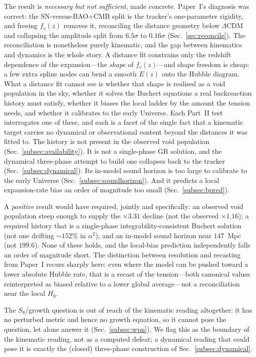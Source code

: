\documentclass[aps,prd,twocolumn,nofootinbib,superscriptaddress,floatfix]{revtex4-2}
\newcommand{\Ho}{H_{0}}
\newcommand{\fvz}{f_{v}(z)}
\newcommand{\Lcdm}{\Lambda\mathrm{CDM}}
\begin{document}
The result is \emph{necessary but not sufficient}, made concrete. Paper~I's
diagnosis was correct: the SN-versus-BAO$+$CMB split is the tracker's one-parameter
rigidity, and freeing $\fvz$ removes it, reconciling the distance geometry below
$\Lcdm$ and collapsing the amplitude split from $6.5\sigma$ to $0.16\sigma$
(Sec.~\ref{sec:reconcile}). The reconciliation is nonetheless purely kinematic, and
the gap between kinematics and dynamics is the whole story. A distance fit
constrains only the redshift dependence of the expansion---the \emph{shape} of
$\fvz$---and shape freedom is cheap: a few extra spline nodes can bend a smooth
$E(z)$ onto the Hubble diagram. What a distance fit cannot see is whether that
shape is realised as a void population in the sky, whether it solves the Buchert
equations a real backreaction history must satisfy, whether it biases the local
ladder by the amount the tension needs, and whether it calibrates to the early
Universe. Each Part~II test interrogates one of these, and each is a facet of the
single fact that a kinematic target carries no dynamical or observational content
beyond the distances it was fitted to. The history is not present in the observed
void population (Sec.~\ref{subsec:availability}). It is not a single-phase GR
solution, and the dynamical three-phase attempt to build one collapses back to the
tracker (Sec.~\ref{subsec:dynamical}). Its in-model sound horizon is too large to
calibrate to the early Universe (Sec.~\ref{subsec:soundhorizon}). And it predicts a
local expansion-rate bias an order of magnitude too small
(Sec.~\ref{subsec:bpred}).

A \emph{positive} result would have required, jointly and specifically: an
observed void population steep enough to supply the $\times3.31$ decline (not the
observed $\times1.16$); a required history that is a single-phase
integrability-consistent Buchert solution (not one drifting $\sim\!152\%$ in
$\alpha^2$); and an in-model sound horizon near $147$~Mpc (not $199.6$). None of
these holds, and the local-bias prediction independently falls an order of
magnitude short. The distinction between resolution and recasting from Paper~I
recurs sharply here: even where the model can be pushed toward a lower absolute
Hubble rate, that is a recast of the tension---both canonical values reinterpreted
as biased relative to a lower global average---not a reconciliation near the local
$\Ho$.

The $S_8$/growth question is out of reach of the kinematic reading altogether: it
has no perturbed metric and hence no growth equation, so it cannot pose the
question, let alone answer it (Sec.~\ref{subsec:wpn}). We flag this as the
boundary of the kinematic reading, not as a computed defeat; a dynamical reading
that could pose it is exactly the (closed) three-phase construction of
Sec.~\ref{subsec:dynamical}.
\end{document}
